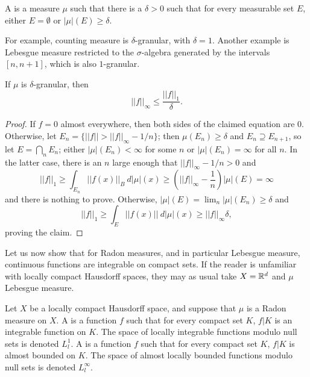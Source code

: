 \begin{definition}
A  is a measure $\mu$ such that there is a $\delta > 0$ such that for every measurable set $E$, either $E = \emptyset$ or $|\mu|(E) \geq \delta$.
\end{definition}

\begin{subsec}
For example, counting measure is $\delta$-granular, with $\delta = 1$.
Another example is Lebesgue measure restricted to the $\sigma$-algebra generated by the intervals $[n, n+1]$, which is also $1$-granular.
\end{subsec}

\begin{lemma}
If $\mu$ is $\delta$-granular, then
$$||f||_\infty \leq \frac{||f||_1}{\delta}.$$
\end{lemma}
\begin{proof}
If $f = 0$ almost everywhere, then both sides of the claimed equation are $0$.
Otherwise, let $E_n = \{||f|| > ||f||_\infty - 1/n\}$; then $\mu(E_n) \geq \delta$ and $E_n \supseteq E_{n+1}$, so let $E = \bigcap_n E_n$; either $|\mu|(E_n) < \infty$ for some $n$ or $|\mu|(E_n) = \infty$ for all $n$.
In the latter case, there is an $n$ large enough that $||f||_\infty - 1/n > 0$ and
$$||f||_1 \geq \int_{E_n} ||f(x)||_B ~d|\mu|(x) \geq (||f||_\infty - \frac{1}{n}) |\mu|(E) = \infty$$
and there is nothing to prove. Otherwise, $|\mu|(E) = \lim_n |\mu|(E_n) \geq \delta$ and
$$||f||_1 \geq \int_E ||f(x)||~d|\mu|(x) \geq ||f||_\infty \delta,$$
proving the claim.
\end{proof}

\begin{subsec}
Let us now show that for Radon measures, and in particular Lebesgue measure, continuous functions are integrable on compact sets.
If the reader is unfamiliar with locally compact Hausdorff spaces, they may as usual take $X = \mathbb{R}^d$ and $\mu$ Lebesgue measure.
\end{subsec}

\begin{definition}
Let $X$ be a locally compact Hausdorff space, and suppose that $\mu$ is a Radon measure on $X$.
A  is a function $f$ such that for every compact set $K$, $f|K$ is an integrable function on $K$.
The space of locally integrable functions modulo null sets is denoted $L^1_l$.
A  is a function $f$ such that for every compact set $K$, $f|K$ is almost bounded on $K$.
The space of almost locally bounded functions modulo null sets is denoted $L^\infty_l$.
\end{definition}

